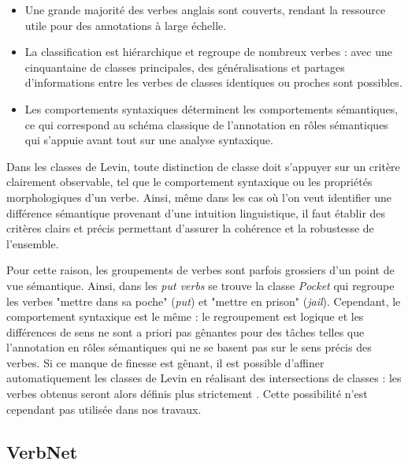\begin{itemize}

    \item Une grande majorité des verbes anglais sont couverts, rendant la
    ressource utile pour des annotations à large échelle.

    \item La classification est hiérarchique et regroupe de nombreux verbes :
    avec une cinquantaine de classes principales, des généralisations et
    partages d'informations entre les verbes de classes identiques ou proches
    sont possibles.

    \item Les comportements syntaxiques déterminent les comportements
    sémantiques, ce qui correspond au schéma classique de l'annotation en rôles
    sémantiques qui s'appuie avant tout sur une analyse syntaxique.

\end{itemize}

Dans les classes de Levin, toute distinction de classe doit s'appuyer sur un
critère clairement observable, tel que le comportement syntaxique ou les
propriétés morphologiques d'un verbe. Ainsi, même dans les cas où l'on veut
identifier une différence sémantique provenant d'une intuition linguistique, il
faut établir des critères clairs et précis permettant d'assurer la cohérence et
la robustesse de l'ensemble.

Pour cette raison, les groupements de verbes sont parfois grossiers d'un point
de vue sémantique. Ainsi, dans les \textit{put verbs} se trouve la classe
\textit{Pocket} qui regroupe les verbes "mettre dans sa poche" (\textit{put}) et
"mettre en prison" (\textit{jail}). Cependant, le comportement syntaxique est le
même : le regroupement est logique et les différences de sens ne sont a priori
pas gênantes pour des tâches telles que l'annotation en rôles sémantiques qui
ne se basent pas sur le sens précis des verbes. Si ce manque de finesse est
gênant, il est possible d'affiner automatiquement les classes de Levin en
réalisant des intersections de classes : les verbes obtenus seront alors
définis plus strictement \citep{dang1998investigating}. Cette possibilité n'est
cependant pas utilisée dans nos travaux.

\subsection{VerbNet}
\label{presentation_verbnet}

